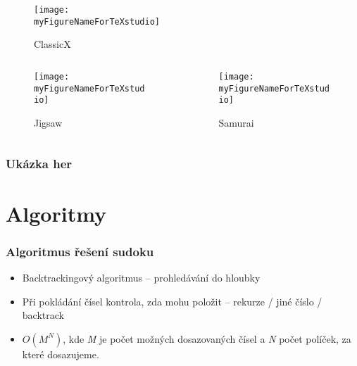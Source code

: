 \documentclass[aspectratio=43]{beamer}
\begin{document}
\begin{frame}[fragile]
\begin{columns}
\begin{column}{0.5\columnwidth}
\begin{columns}
\begin{column}{0.5\columnwidth}
\begin{figure}[H]
						\texttt{[image: \\myFigureNameForTeXstudio]}
						\caption{ClassicX}
						\label{fig:ClassicX}
					\end{figure}
				\end{column}
			\end{columns}
			\begin{columns}
				\begin{column}{0.5\columnwidth}
					\begin{figure}[H]
						\centering {}
						\texttt{[image: \\myFigureNameForTeXstudio]}
						\caption{Jigsaw}
						\label{fig:Classic}
					\end{figure}
				\end{column}
				\begin{column}{0.5\columnwidth}
					\begin{figure}[H]
						\centering
						\def\myFigureNameForTeXstudio{../img/9x9samurai.png}
						\texttt{[image: \\myFigureNameForTeXstudio]}
						\caption{Samurai}
						\label{fig:ClassicX}
					\end{figure}
				\end{column}
			\end{columns}
		\end{column}
	\end{columns}
\end{frame}

\begin{frame}[fragile]
	\frametitle{Ukázka her}
	
\end{frame}

\section{Algoritmy}
\begin{frame}[fragile]
	\frametitle{Algoritmus řešení sudoku}

	\begin{itemize}
		\item Backtrackingový algoritmus -- prohledávání do hloubky
		\item Při pokládání čísel kontrola, zda mohu položit -- rekurze / jiné 
		číslo / backtrack
		\item $O(M^{N})$, kde \textit{M} je počet možných dosazovaných čísel a 
		\textit{N} počet políček, za které dosazujeme.
	\end{itemize}
\end{frame}
\end{document}
